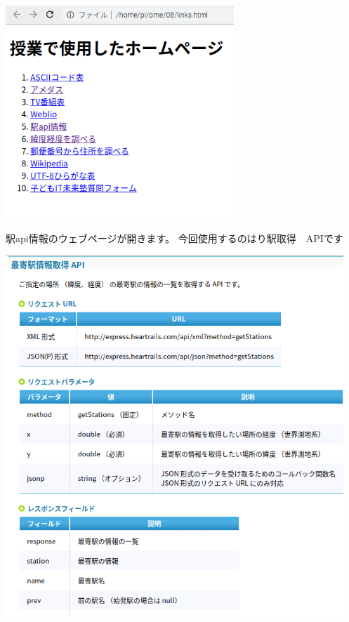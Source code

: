 \documentclass[a4paper,12pt,dvipdfmx]{jarticle}
\begin{document}
\begin{center}
\includegraphics[width=8.59cm]{textbook-img017.png}

\end{center}


\bigskip


\bigskip

駅api情報のウェブページが開きます。
今回使用するのはり駅取得　APIです



\begin{center}
\includegraphics[width=12.719cm]{textbook-img049.png}

\end{center}
\end{document}
